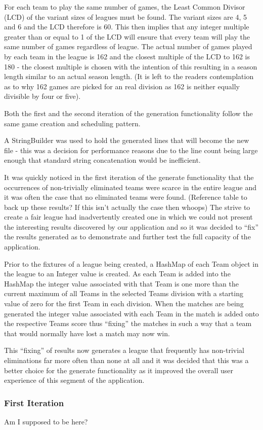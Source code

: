 For each team to play the same number of games, the Least Common
Divisor (LCD) of the variant sizes of leagues must be found. The
variant sizes are 4, 5 and 6 and the LCD therefore is 60. This then
implies that any integer multiple greater than or equal to 1 of the
LCD will ensure that every team will play the same number of games
regardless of league. The actual number of games played by each team
in the league is 162 and the closest multiple of the LCD to 162 is 180
- the closest multiple is chosen with the intention of this resulting
in a season length similar to an actual season length. (It is left to
the readers contemplation as to why 162 games are picked for an real
division as 162 is neither equally divisible by four or five).

Both the first and the second iteration of the generation
functionality follow the same game creation and scheduling pattern. 


A StringBuilder was used to hold the generated lines that will become
the new file - this was a decision for performance reasons due to the
line count being large enough that standard string concatenation would
be inefficient.

It was quickly noticed in the first iteration of the generate
functionality that the occurrences of non-trivially eliminated teams
were scarce in the entire league and it was often the case that no
eliminated teams were found. (Reference table to back up these
results? If this isn't actually the case then whoops) The strive to
create a fair league had inadvertently created one in which we could
not present the interesting results discovered by our application and
so it was decided to ``fix'' the results generated as to demonstrate
and further test the full capacity of the application.

Prior to the fixtures of a league being created, a HashMap of each
Team object in the league to an Integer value is created. As each Team
is added into the HashMap the integer value associated with that Team
is one more than the current maximum of all Teams in the selected
Teams division with a starting value of zero for the first Team in
each division. When the matches are being generated the integer value
associated with each Team in the match is added onto the respective
Teams score thus ``fixing'' the matches in such a way that a team that
would normally have lost a match may now win. 

This ``fixing'' of results now generates a league that frequently has
non-trivial eliminations far more often than none at all and it was
decided that this was a better choice for the generate functionality
as it improved the overall user experience of this segment of the
application. 


\subsubsection{First Iteration}

Am I supposed to be here?
